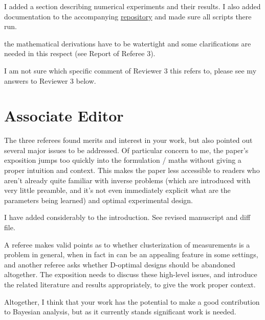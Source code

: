 \documentclass{article}
\begin{document}
\AR I added a section describing numerical experiments and their
results. I also added documentation to the accompanying
\href{https://github.com/yairdaon/OED}{repository} and made sure all
scripts there run.
    
    
\RC the mathematical derivations have to be watertight and some
clarifications are needed in this respect (see Report of Referee 3).
    

\AR I am not sure which specific comment of Reviewer 3 this
      refers to, please see my answers to Reviewer 3 below.
   

\section{Associate Editor}
\RC The three referees found merits and interest in your work, but also
pointed out several major issues to be addressed. Of particular
concern to me, the paper's exposition jumps too quickly into the
formulation / maths without giving a proper intuition and
context. This makes the paper less accessible to readers who aren't
already quite familiar with inverse problems (which are introduced
with very little preamble, and it's not even immediately explicit what
are the parameters being learned) and optimal experimental design.

\AR I have added considerably to the introduction. See revised
manuscript and diff file.


\RC A referee makes valid points as to whether clusterization of
measurements is a problem in general, when in fact in can be an
appealing feature in some settings, and another referee asks whether
D-optimal designs should be abandoned altogether. The exposition
needs to discuss these high-level issues, and introduce the related
literature and results appropriately, to give the work proper
context.



\RC Altogether, I think that your work has the potential to make a
good contribution to Bayesian analysis, but as it currently stands
significant work is needed.









\end{document}

